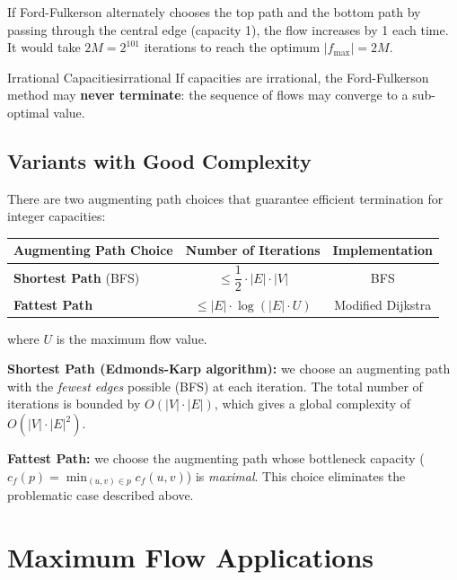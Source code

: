 If Ford-Fulkerson alternately chooses the top path and the bottom path 
by passing through the central edge (capacity 1), the flow increases by 1 
each time. It would take $2M = 2^{101}$ iterations to reach the optimum $|f_{\max}| = 2M$.

\begin{remark}{Irrational Capacities}{irrational}
If capacities are irrational, the Ford-Fulkerson method may 
\textbf{never terminate}: the sequence of flows may converge to a 
sub-optimal value.
\end{remark}

\subsection{Variants with Good Complexity}

There are two augmenting path choices that guarantee efficient 
termination for integer capacities:

\begin{center}
\renewcommand{\arraystretch}{1.5}
\begin{tabular}{lcc}
\toprule
\textbf{Augmenting Path Choice} & \textbf{Number of Iterations} & \textbf{Implementation} \\
\midrule
\textbf{Shortest Path} (BFS) & $\le \dfrac{1}{2} \cdot |E| \cdot |V|$ & BFS \\[6pt]
\textbf{Fattest Path} & $\le |E| \cdot \log(|E| \cdot U)$ & Modified Dijkstra \\
\bottomrule
\end{tabular}
\end{center}

where $U$ is the maximum flow value.

\textbf{Shortest Path (Edmonds-Karp algorithm):} we choose an augmenting 
path with the \emph{fewest edges} possible (BFS) at each iteration. 
The total number of iterations is bounded by $O(|V| \cdot |E|)$, which 
gives a global complexity of $O(|V| \cdot |E|^2)$.

\textbf{Fattest Path:} we choose the augmenting path whose 
bottleneck capacity ($c_f(p) = \min_{(u,v)\in p} c_f(u,v)$) is 
\emph{maximal}. This choice eliminates the problematic case described above.

\section*{Maximum Flow Applications}


